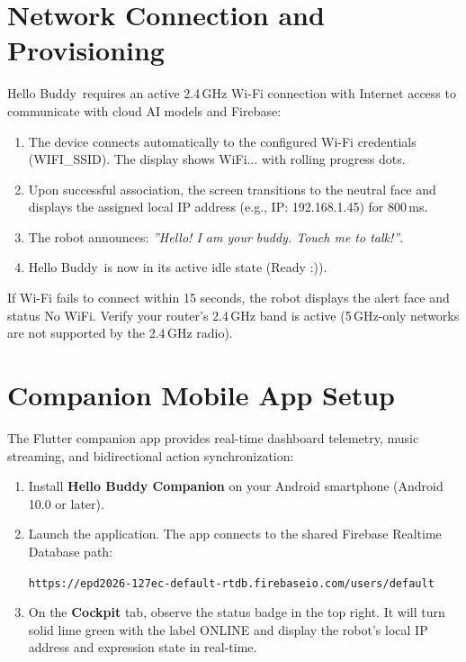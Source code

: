 \documentclass[11pt,a4paper,oneside]{report}
\newcommand{\menu}[1]{\textsf{\textbf{#1}}}
\newcommand{\ui}[1]{\textsf{#1}}
\newcommand{\ProductName}{Hello Buddy}
\begin{document}
\section{Network Connection and Provisioning}
\ProductName\ requires an active 2.4\,GHz Wi-Fi connection with Internet access to communicate with cloud AI models and Firebase:
\begin{enumerate}[leftmargin=*]
\item The device connects automatically to the configured Wi-Fi credentials (\ui{WIFI\_SSID}). The display shows \ui{WiFi...} with rolling progress dots.
\item Upon successful association, the screen transitions to the neutral face and displays the assigned local IP address (e.g., \ui{IP: 192.168.1.45}) for 800\,ms.
\item The robot announces: \emph{''Hello! I am your buddy. Touch me to talk!''}.
\item \ProductName\ is now in its active idle state (\ui{Ready :)}).
\end{enumerate}

\begin{tip}
If Wi-Fi fails to connect within 15 seconds, the robot displays the alert face and status \ui{No WiFi}. Verify your router's 2.4\,GHz band is active (5\,GHz-only networks are not supported by the 2.4\,GHz radio).
\end{tip}

\section{Companion Mobile App Setup}
The Flutter companion app provides real-time dashboard telemetry, music streaming, and bidirectional action synchronization:
\begin{enumerate}[leftmargin=*]
\item Install \textbf{Hello Buddy Companion} on your Android smartphone (Android 10.0 or later).
\item Launch the application. The app connects to the shared Firebase Realtime Database path:
\begin{center}\texttt{https://epd2026-127ec-default-rtdb.firebaseio.com/users/default}\end{center}
\item On the \menu{Cockpit} tab, observe the status badge in the top right. It will turn solid lime green with the label \ui{ONLINE} and display the robot's local IP address and expression state in real-time.
\end{enumerate}
\end{document}
